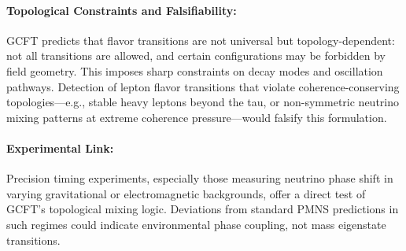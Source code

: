 \paragraph{Topological Constraints and Falsifiability:}
GCFT predicts that flavor transitions are not universal but topology-dependent: not all transitions are allowed, and certain configurations may be forbidden by field geometry. This imposes sharp constraints on decay modes and oscillation pathways. Detection of lepton flavor transitions that violate coherence-conserving topologies---e.g., stable heavy leptons beyond the tau, or non-symmetric neutrino mixing patterns at extreme coherence pressure---would falsify this formulation.

\paragraph{Experimental Link:}
Precision timing experiments, especially those measuring neutrino phase shift in varying gravitational or electromagnetic backgrounds, offer a direct test of GCFT's topological mixing logic. Deviations from standard PMNS predictions in such regimes could indicate environmental phase coupling, not mass eigenstate transitions.

